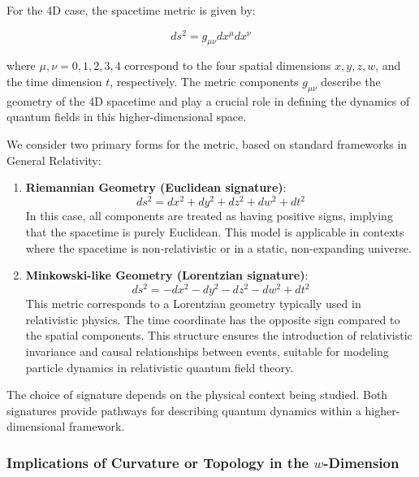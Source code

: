 \documentclass[12pt]{article}
\begin{document}
For the 4D case, the spacetime metric is given by:

\begin{equation}
ds^2 = g_{\mu \nu} dx^\mu dx^\nu
\end{equation}

where \( \mu, \nu = 0, 1, 2, 3, 4 \) correspond to the four spatial dimensions \( x, y, z, w \), and the time dimension \( t \), respectively. The metric components \( g_{\mu \nu} \) describe the geometry of the 4D spacetime and play a crucial role in defining the dynamics of quantum fields in this higher-dimensional space.

We consider two primary forms for the metric, based on standard frameworks in General Relativity:

\begin{enumerate}
    \item \textbf{Riemannian Geometry (Euclidean signature)}:
    \begin{equation}
    ds^2 = dx^2 + dy^2 + dz^2 + dw^2 + dt^2
    \end{equation}
    In this case, all components are treated as having positive signs, implying that the spacetime is purely Euclidean. This model is applicable in contexts where the spacetime is non-relativistic or in a static, non-expanding universe.
    
    \item \textbf{Minkowski-like Geometry (Lorentzian signature)}:
    \begin{equation}
    ds^2 = -dx^2 - dy^2 - dz^2 - dw^2 + dt^2
    \end{equation}
    This metric corresponds to a Lorentzian geometry typically used in relativistic physics. The time coordinate has the opposite sign compared to the spatial components. This structure ensures the introduction of relativistic invariance and causal relationships between events, suitable for modeling particle dynamics in relativistic quantum field theory.
\end{enumerate}

The choice of signature depends on the physical context being studied. Both signatures provide pathways for describing quantum dynamics within a higher-dimensional framework.

\subsubsection{Implications of Curvature or Topology in the \( w \)-Dimension}
\end{document}
